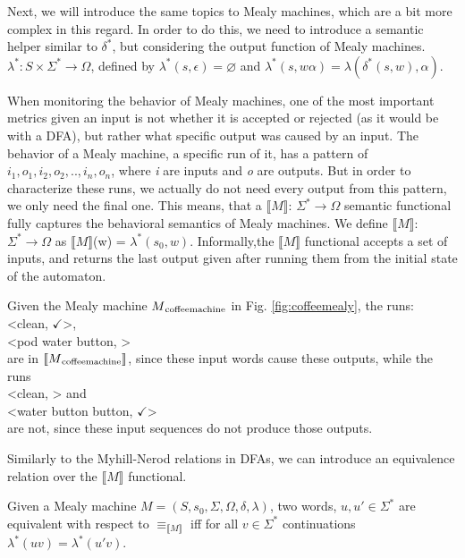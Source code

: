 Next, we will introduce the same topics to Mealy machines, which are a bit more complex in this regard. In order to do this, we need to introduce a semantic helper similar to $\delta^*$, but considering the output function of Mealy machines. $\lambda^*: S\times\Sigma^* \to \Omega$, defined by $\lambda^*(s, \epsilon) = \varnothing$ and $\lambda^*(s, w\alpha) = \lambda(\delta^*(s, w), \alpha)$.



When monitoring the behavior of Mealy machines, one of the most important metrics given an input is not whether it is accepted or rejected (as it would be with a DFA), but rather what specific output was caused by an input. The behavior of a Mealy machine, a specific run of it, has a pattern of \textit{$i_1,o_1,i_2,o_2,..,i_n,o_n$}, where \textit{i} are inputs and \textit{o} are outputs. But in order to characterize these runs, we actually do not need every output from this pattern, we only need the final one. This means, that a $\llbracket M\rrbracket$: $\Sigma^*\to\Omega$ semantic functional fully captures the behavioral semantics of Mealy machines. We define $\llbracket M\rrbracket$: $\Sigma^*\to\Omega$ as  $\llbracket M\rrbracket$(w) = $\lambda^*(s_0, w)$. Informally,the  $\llbracket M\rrbracket$ functional accepts a set of inputs, and returns the last output given after running them from the initial state of the automaton.

\begin{example}
	Given the Mealy machine $M\textsubscript{coffeemachine}$ in Fig. \ref{fig:coffeemealy}, the runs:\\
	\null\qquad<clean, $\checkmark$>, \\
	\null\qquad<pod water button, \Coffeecup> \\
	are in $\llbracket M\textsubscript{coffeemachine}\rrbracket$, since these input words cause these outputs, while the runs\\
	\null\qquad<clean, \Coffeecup> and \\
	\null\qquad<water button button, $\checkmark$> \\
	are not, since these input sequences do not produce those outputs.
\end{example}

Similarly to the Myhill-Nerod relations in DFAs, we can introduce an equivalence relation over the $\llbracket M \rrbracket$ functional.

\begin{definition}
	Given a Mealy machine $M=(S,s_{0},\Sigma,\Omega,\delta,\lambda) $, two words, $u, u'\in\Sigma^*$ are equivalent with respect to $\equiv_{\llbracket M \rrbracket}$ iff for all $v\in\Sigma^*$ continuations $\lambda^*(uv) = \lambda^*(u'v)$.
\end{definition}






